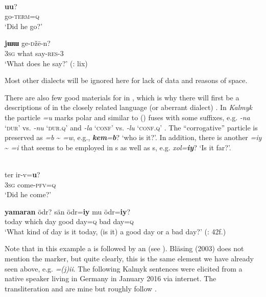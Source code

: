 \ea%
    \label{ex:mong:32}
    \\
    \ea
    \textbf{{uu}}?\\
    go-\textsc{term}=\textsc{q}\\
    \glt ‘Did he go?’ \citep[208]{Georg2003a}
    
    \ex
     \textbf{{j}}\textbf{{ɯɯ}} {ge-}\textsc{d}{ž\=e-n?}\\
    3\textsc{sg}  what  say-\textsc{res-3}\\
    \glt ‘What does he say?’ (\citealt{Mostaert1937}: lix)
    \z
    \z

\noindent Most other dialects will be ignored here for lack of data and reasons of space.

\largerpage[2]
There are also few good materials for  in , which is why there will first be a descriptions of  in the closely related language (or aberrant dialect) . In \textit{Kalmyk} the  particle \textit{=u} marks polar  and similar to  () fuses with some suffixes, e.g. \textit{-na} ‘\textsc{dur}’ vs. \textit{-nu} ‘\textsc{dur.q}’ and \textit{-la} ‘\textsc{conf}’ vs. \textit{-lu} ‘\textsc{conf.q}’ \citep[42]{Benzing1985}. The “corrogative” particle is preserved as \textit{=b} {\textasciitilde} \textit{=w}, e.g., \textbf{\textit{kem}}\textit{=}\textbf{\textit{b}}? ‘who is it?’. In addition, there is another  \textit{=iy} {\textasciitilde} \textit{=i} that seems to be employed in s as well as s, e.g. \textit{xol=}\textbf{\textit{iy}}? ‘Is it far?’.

\ea%
    \label{ex:mong:33}
    \\
    \ea
    \gll ter  ir-v=\textbf{{u}}?\\
    3\textsc{sg}  come-\textsc{pfv}=\textsc{q}\\
    \glt ‘Did he come?’
    
    \ex
     \textbf{{yamaran}} ödr?  sän  ödr=\textbf{{iy}} mu  ödr=\textbf{{iy}}?\\
    today  which    day  good  day=\textsc{q}  bad  day=\textsc{q}\\
    \glt ‘What kind of day is it today, (is it) a good day or a bad day?’ (\citealt{Benzing1985}: 42f.)
    \z
    \z

\noindent Note that in this example a  is followed by an  (see ). Bläsing (2003) does not mention the marker, but quite clearly, this is the same element we have already seen above, e.g.  \textit{=(j)ii}. The following Kalmyk sentences were elicited from a native speaker living in Germany in January 2016 via internet. The transliteration and  are mine but roughly follow \cite{Bläsing2003}.

